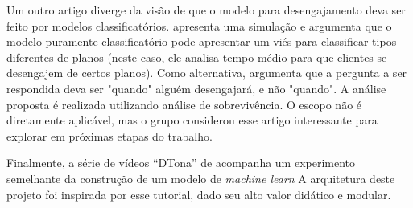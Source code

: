 Um outro artigo diverge da visão de que o modelo para desengajamento deva ser feito por modelos classificatórios.
 apresenta uma simulação e argumenta que o modelo puramente classificatório pode apresentar um viés para classificar tipos diferentes de planos (neste caso, ele analisa tempo médio para que clientes se desengajem de certos planos).
Como alternativa,  argumenta que a pergunta a ser respondida deva ser "quando" alguém desengajará, e não "quando". A análise proposta é realizada utilizando análise de sobrevivência.
O escopo não é diretamente aplicável, mas o grupo considerou esse artigo interessante para explorar em próximas etapas do trabalho.

Finalmente, a série de vídeos ``DTona'' de  acompanha um experimento semelhante da construção de um modelo de \textit{machine learn} 
A arquitetura deste projeto foi inspirada por esse tutorial, dado seu alto valor didático e modular.